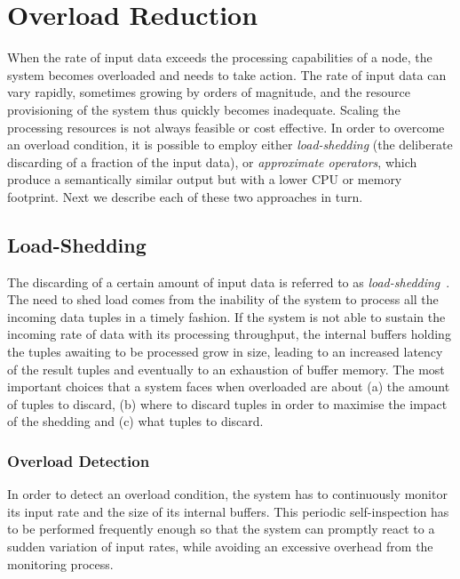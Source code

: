 \section{Overload Reduction}

When the rate of input data exceeds the processing capabilities of a node, the system becomes overloaded
and needs to take action. The rate of input data can vary rapidly, sometimes growing by orders of
magnitude, and the resource provisioning of the system thus quickly becomes inadequate. Scaling the
processing resources is not always feasible or cost effective. In order to overcome an overload
condition, it is possible to employ either \emph{\mbox{load-shedding}} (\ie the deliberate discarding of
a fraction of the input data), or \emph{approximate operators}, which produce a semantically similar
output but with a lower CPU or memory footprint. Next we describe each of these two approaches in turn.

\subsection*{Load-Shedding}

The discarding of a certain amount of input data is referred to as
\emph{load-shedding}~\cite{load-shedding}. The need to shed load comes from the inability of the system
to process all the incoming data tuples in a timely fashion. If the system is not able to sustain the
incoming rate of data with its processing throughput, the internal buffers holding the tuples awaiting
to be processed grow in size, leading to an increased latency of the result tuples and eventually to an
exhaustion of buffer memory. The most important choices that a system faces when overloaded are about (a)
the amount of tuples to discard, (b) where to discard tuples in order to maximise the impact of the
shedding and (c) what tuples to discard.
\subsubsection*{Overload Detection} 
In order to detect an overload condition, the system has to continuously monitor its input rate and the
size of its internal buffers. This periodic self-inspection has to be performed frequently enough so that
the system can promptly react to a sudden variation of input rates, while avoiding an excessive overhead
from the monitoring process.

